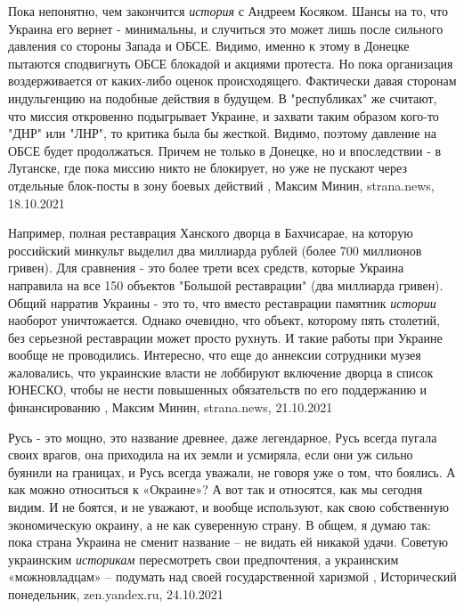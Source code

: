Пока непонятно, чем закончится \emph{история} с Андреем Косяком. Шансы на то,
что Украина его вернет - минимальны, и случиться это может лишь после сильного
давления со стороны Запада и ОБСЕ.  Видимо, именно к этому в Донецке пытаются
сподвигнуть ОБСЕ блокадой и акциями протеста. Но пока организация
воздерживается от каких-либо оценок происходящего. Фактически давая сторонам
индульгенцию на подобные действия в будущем.  В "республиках" же считают, что
миссия откровенно подыгрывает Украине, и захвати таким образом кого-то "ДНР"
или "ЛНР", то критика была бы жесткой.  Видимо, поэтому давление на ОБСЕ будет
продолжаться. Причем не только в Донецке, но и впоследствии - в Луганске, где
пока миссию никто не блокирует, но уже не пускают через отдельные блок-посты в
зону боевых действий
, 
Максим Минин, strana.news, 18.10.2021

Например, полная реставрация Ханского дворца в Бахчисарае, на которую
российский минкульт выделил два миллиарда рублей (более 700 миллионов гривен).
Для сравнения - это более трети всех средств, которые Украина направила на все
150 объектов "Большой реставрации" (два миллиарда гривен).  Общий нарратив
Украины - это то, что вместо реставрации памятник \emph{истории} наоборот
уничтожается. Однако очевидно, что объект, которому пять столетий, без
серьезной реставрации может просто рухнуть. И такие работы при Украине вообще
не проводились.  Интересно, что еще до аннексии сотрудники музея жаловались,
что украинские власти не лоббируют включение дворца в список ЮНЕСКО, чтобы не
нести повышенных обязательств по его поддержанию и финансированию
, 
Максим Минин, strana.news, 21.10.2021

Русь - это мощно, это название древнее, даже легендарное, Русь всегда пугала
своих врагов, она приходила на их земли и усмиряла, если они уж сильно буянили
на границах, и Русь всегда уважали, не говоря уже о том, что боялись.  А как
можно относиться к «Окраине»?  А вот так и относятся, как мы сегодня видим. И
не боятся, и не уважают, и вообще используют, как свою собственную
экономическую окраину, а не как суверенную страну.  В общем, я думаю так: пока
страна Украина не сменит название – не видать ей никакой удачи. Советую
украинским \emph{историкам} пересмотреть свои предпочтения, а украинским
«можновладцам» – подумать над своей государственной харизмой
, 
Исторический понедельник, zen.yandex.ru, 24.10.2021

